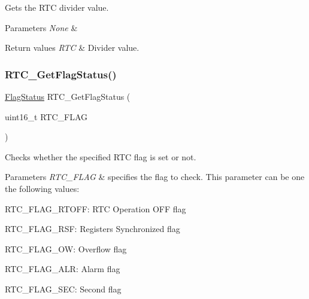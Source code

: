 Gets the R\+TC divider value. 


\begin{DoxyParams}{Parameters}
{\em None} & \\
\hline
\end{DoxyParams}

\begin{DoxyRetVals}{Return values}
{\em R\+TC} & Divider value. \\
\hline
\end{DoxyRetVals}
\mbox{\label{group___r_t_c___exported___functions_ga21a85e5f846cb4552d5e76420779f3f6}} 
\subsubsection{\texorpdfstring{RTC\_GetFlagStatus()}{RTC\_GetFlagStatus()}}
{\footnotesize\ttfamily \mbox{\hyperlink{group___exported__types_ga89136caac2e14c55151f527ac02daaff}{Flag\+Status}} R\+T\+C\+\_\+\+Get\+Flag\+Status (\begin{DoxyParamCaption}\item[{uint16\+\_\+t}]{R\+T\+C\+\_\+\+F\+L\+AG }\end{DoxyParamCaption})}



Checks whether the specified R\+TC flag is set or not. 


\begin{DoxyParams}{Parameters}
{\em R\+T\+C\+\_\+\+F\+L\+AG} & specifies the flag to check. This parameter can be one the following values\+: \begin{DoxyItemize}
\item R\+T\+C\+\_\+\+F\+L\+A\+G\+\_\+\+R\+T\+O\+FF\+: R\+TC Operation O\+FF flag \item R\+T\+C\+\_\+\+F\+L\+A\+G\+\_\+\+R\+SF\+: Registers Synchronized flag \item R\+T\+C\+\_\+\+F\+L\+A\+G\+\_\+\+OW\+: Overflow flag \item R\+T\+C\+\_\+\+F\+L\+A\+G\+\_\+\+A\+LR\+: Alarm flag \item R\+T\+C\+\_\+\+F\+L\+A\+G\+\_\+\+S\+EC\+: Second flag \end{DoxyItemize}
\\
\hline
\end{DoxyParams}

